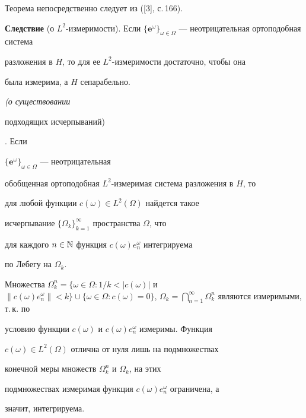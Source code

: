 Теорема непосредственно следует из ([3], с.\,166).


\smallskip





{\bf Следствие }(о $L^2$-измеримости). Если $\{\boldsymbol


e^\omega\}_{\omega\in\Omega}$ --- неотрицательная ортоподобная система


разложения в $H$, то для ее $L^2$-измеримости достаточно, чтобы она


была измерима, а $H$ сепарабельно.





\begin{lem} {\em (о существовании 


подходящих исчерпываний)}. Если


$\{\boldsymbol e^\omega\}_{\omega\in\Omega}$ --- неотрицательная


обобщенная ортоподобная $L^2$-измеримая система разложения в $H$, то


для любой функции $c(\omega)\in L^2(\Omega)$ найдется такое


исчерпывание ${\{\Omega_k}\}^\infty_{k=1}$ пространства $\Omega$, что


для каждого $n\in\Bbb N$ функция $c(\omega)e_n^\omega$ интегрируема


по Лебегу на $\Omega_ k$.


\end{lem}





\begin{pf}


Множества $\Omega_k^n=\{\omega\in


\Omega:1/k<|c(\omega)|$ и $\|c(\omega)e^\omega_n\|


<k\}\cup\{\omega\in\Omega:c(\omega)=0\}$, $\Omega_k


=\bigcap_{n=1}^\infty\Omega_k^n$ являются измеримыми, т.\,к. по


условию функции $c(\omega)$ и $c(\omega)e^\omega_n$ измеримы. Функция


$c(\omega)\in L^2(\Omega )$ отлична от нуля лишь на подмножествах


конечной меры множеств $\Omega_k^n$ и $\Omega_k$, на этих


подмножествах измеримая функция $c(\omega)e^\omega_n$ ограничена, а


значит, интегрируема.


\end{pf}





